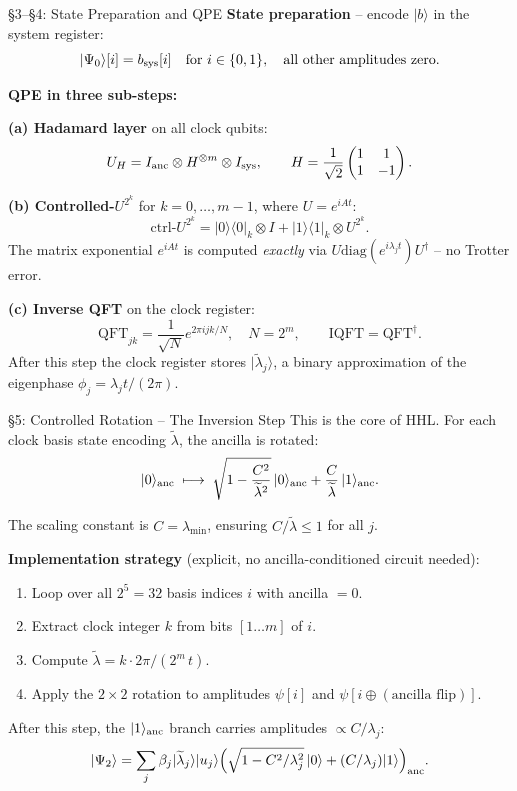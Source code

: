\documentclass{beamer}
\begin{document}

\begin{frame}{\S3--\S4: State Preparation and QPE}
\textbf{State preparation} -- encode $|b\rangle$ in the system register:
\[
  |\Psi_0\rangle[i] = b_{\rm sys}[i]
  \quad \text{for } i \in \{0,1\},
  \quad \text{all other amplitudes zero.}
\]

\textbf{QPE in three sub-steps:}

\medskip
\textbf{(a) Hadamard layer} on all clock qubits:
\[
  U_H = I_{\rm anc} \otimes H^{\otimes m} \otimes I_{\rm sys},
  \qquad
  H = \frac{1}{\sqrt{2}}\begin{pmatrix}1&1\\1&-1\end{pmatrix}.
\]

\textbf{(b) Controlled-$U^{2^k}$} for $k=0,\ldots,m-1$, where $U = e^{iAt}$:
\[
  \mathrm{ctrl}\text{-}U^{2^k}
  = |0\rangle\langle 0|_{k} \otimes I
  + |1\rangle\langle 1|_{k} \otimes U^{2^k}.
\]
The matrix exponential $e^{iAt}$ is computed \emph{exactly} via
$U \mathrm{diag}(e^{i\lambda_j t}) U^\dagger$ -- no Trotter error.

\textbf{(c) Inverse QFT} on the clock register:
\[
  \mathrm{QFT}_{jk} = \frac{1}{\sqrt{N}} e^{2\pi i jk/N},
  \quad N = 2^m,
  \qquad \mathrm{IQFT} = \mathrm{QFT}^\dagger.
\]
After this step the clock register stores $|\widetilde{\lambda}_j\rangle$,
a binary approximation of the eigenphase
$\phi_j = \lambda_j t / (2\pi)$.
\end{frame}


\begin{frame}{\S5: Controlled Rotation -- The Inversion Step}
This is the core of HHL.
For each clock basis state encoding $\widetilde{\lambda}$,
the ancilla is rotated:
\[
  |0\rangle_{\rm anc}
  \;\longmapsto\;
  \sqrt{1 - \frac{C^2}{\widetilde{\lambda}^2}}\,|0\rangle_{\rm anc}
  +\frac{C}{\widetilde{\lambda}}\,|1\rangle_{\rm anc}.
\]

The scaling constant is $C = \lambda_{\min}$, ensuring
$C/\widetilde{\lambda} \le 1$ for all $j$.

\medskip
\textbf{Implementation strategy} (explicit, no ancilla-conditioned circuit needed):
\begin{enumerate}
  \item Loop over all $2^5 = 32$ basis indices $i$ with ancilla $= 0$.
  \item Extract clock integer $k$ from bits $[1 \ldots m]$ of $i$.
  \item Compute $\widetilde{\lambda} = k\cdot 2\pi/(2^m\,t)$.
  \item Apply the $2\times 2$ rotation to amplitudes
        $\psi[i]$ and $\psi[i \oplus (\text{ancilla flip})]$.
\end{enumerate}

After this step, the $|1\rangle_{\rm anc}$ branch carries amplitudes
$\propto C/\lambda_j$:
\[
  |\Psi_2\rangle
  = \sum_j \beta_j |\widetilde{\lambda}_j\rangle|u_j\rangle
  \Bigl(\sqrt{1-C^2/\lambda_j^2}\,|0\rangle + (C/\lambda_j)|1\rangle\Bigr)_{\rm anc}.
\]
\end{frame}
\end{document}
